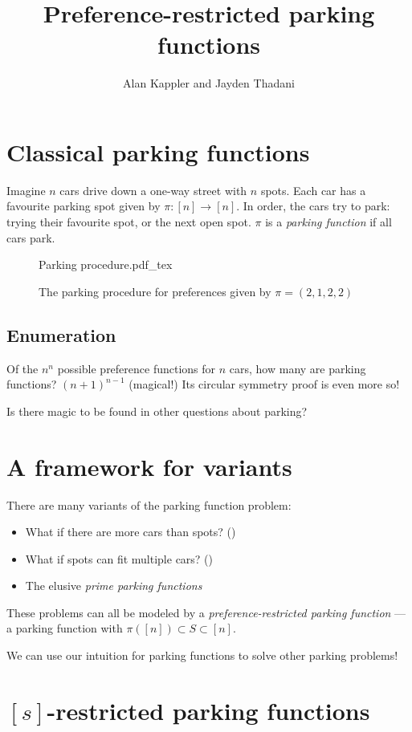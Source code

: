 \documentclass[thesis]{hmcposter}
\author{Alan Kappler and Jayden Thadani}
\title{Preference-restricted parking functions}
\newcommand{\incfig}[1]{%
    \def\svgwidth{0.8 \columnwidth}
    {#1.pdf_tex}
}
\begin{document}
\begin{poster}

\section{Classical parking functions}

Imagine $n$ cars drive down a one-way street with $n$ spots. Each car has a favourite parking spot given by $\pi:[n] \to [n]$. In order, the cars try to park: trying their favourite spot, or the next open spot. $\pi$ is a \emph{parking function} if all cars park.

\begin{figure}
    \centering
    \incfig{Parking procedure}
    \caption{The parking procedure for preferences given by $\pi = (2, 1, 2, 2)$}
    \label{fig:parking-procedure}
\end{figure}

\subsection{Enumeration}

Of the $n^n$ possible preference functions for $n$ cars, how many are parking functions? $(n + 1)^{n - 1}$ (magical!) Its circular symmetry proof is even more so!

Is there magic to be found in other questions about parking?

\section{A framework for variants}%

There are many variants of the parking function problem:
\begin{itemize}
\item What if there are more cars than spots? (\cite{cameron-johannsen-prellberg-schweitzer-2008})
\item What if spots can fit multiple cars? (\cite{blake-konheim-1977})
\item The elusive \emph{prime parking functions}
\end{itemize}

These problems can all be modeled by a \emph{preference-restricted parking function} --- a parking function with $\pi([n]) \subset S \subset [n]$.

We can use our intuition for parking functions to solve other parking problems!

\section{$[s]$-restricted parking functions}


\end{poster}
\end{document}
